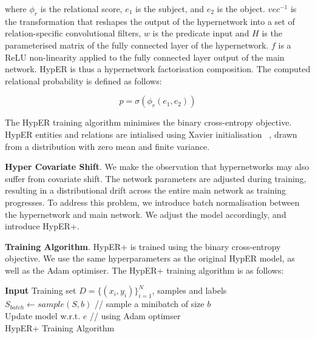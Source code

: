 where $\phi_r$ is the relational score, $e_1$ is the subject, and $e_2$ is the object. $vec^{-1}$ is the transformation that reshapes the output of the hypernetwork into a set of relation-specific convolutional filters, $w$ is the predicate input and $H$ is the parameterised matrix of the fully connected layer of the hypernetwork. $f$ is a ReLU non-linearity applied to the fully connected layer output of the main network. HypER is thus a hypernetwork factorisation composition. The computed relational probability is defined as follows: 

\begin{equation}
	p = \sigma(\phi_r(e_1,e_2)) 
\end{equation}

The HypER training algorithm minimises the binary cross-entropy objective. HypER entities and relations are intialised using Xavier initialisation ~\citep{glorot2010understanding}, drawn from a distribution with zero mean and finite variance. \newpage

\textbf{Hyper Covariate Shift}. We make the observation that hypernetworks may also suffer from covariate shift. The network parameters are adjusted during training, resulting in a distributional drift across the entire main network as training progresses. To address this problem, we introduce batch normalisation between the hypernetwork and main network. We adjust the model accordingly, and introduce HypER+. \bigskip 

\textbf{Training Algorithm}. HypER+ is trained using the binary cross-entropy objective. We use the same hyperparameters as the original HypER model, as well as the Adam optimiser. The HypER+ training algorithm is as follows: \newline

\begin{algorithm}[H]
	\SetAlgoLined
	\textbf{Input} 
	Training set \begin{math} D = \{(x_i, y_i)\}_{i=1}^N \end{math}, samples and labels\;
  	\begin{math} S_{batch} \gets sample(S, b) \end{math} // sample a minibatch of size \begin{math} b \end{math} \\
	Update model w.r.t. \begin{math}  e \end{math} // using Adam optimser \\
	\caption{HypER+ Training Algorithm}
\end{algorithm} \bigskip
 \bigskip
 
